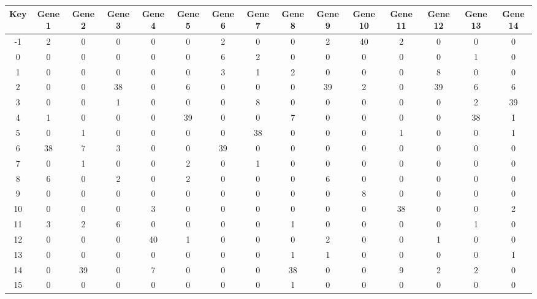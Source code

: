 \begin{tabular}{|c|c|c|c|c|c|c|c|c|c|c|c|c|c|c|}
\hline
Key & Gene 1 & Gene 2 & Gene 3 & Gene 4 & Gene 5 & Gene 6 & Gene 7 & Gene 8 & Gene 9 & Gene 10 & Gene 11 & Gene 12 & Gene 13 & Gene 14 \\
\hline
-1 & 2 & 0 & 0 & 0 & 0 & 2 & 0 & 0 & 2 & 40 & 2 & 0 & 0 & 0 \\
0 & 0 & 0 & 0 & 0 & 0 & 6 & 2 & 0 & 0 & 0 & 0 & 0 & 1 & 0 \\
1 & 0 & 0 & 0 & 0 & 0 & 3 & 1 & 2 & 0 & 0 & 0 & 8 & 0 & 0 \\
2 & 0 & 0 & 38 & 0 & 6 & 0 & 0 & 0 & 39 & 2 & 0 & 39 & 6 & 6 \\
3 & 0 & 0 & 1 & 0 & 0 & 0 & 8 & 0 & 0 & 0 & 0 & 0 & 2 & 39 \\
4 & 1 & 0 & 0 & 0 & 39 & 0 & 0 & 7 & 0 & 0 & 0 & 0 & 38 & 1 \\
5 & 0 & 1 & 0 & 0 & 0 & 0 & 38 & 0 & 0 & 0 & 1 & 0 & 0 & 1 \\
6 & 38 & 7 & 3 & 0 & 0 & 39 & 0 & 0 & 0 & 0 & 0 & 0 & 0 & 0 \\
7 & 0 & 1 & 0 & 0 & 2 & 0 & 1 & 0 & 0 & 0 & 0 & 0 & 0 & 0 \\
8 & 6 & 0 & 2 & 0 & 2 & 0 & 0 & 0 & 6 & 0 & 0 & 0 & 0 & 0 \\
9 & 0 & 0 & 0 & 0 & 0 & 0 & 0 & 0 & 0 & 8 & 0 & 0 & 0 & 0 \\
10 & 0 & 0 & 0 & 3 & 0 & 0 & 0 & 0 & 0 & 0 & 38 & 0 & 0 & 2 \\
11 & 3 & 2 & 6 & 0 & 0 & 0 & 0 & 1 & 0 & 0 & 0 & 0 & 1 & 0 \\
12 & 0 & 0 & 0 & 40 & 1 & 0 & 0 & 0 & 2 & 0 & 0 & 1 & 0 & 0 \\
13 & 0 & 0 & 0 & 0 & 0 & 0 & 0 & 1 & 1 & 0 & 0 & 0 & 0 & 1 \\
14 & 0 & 39 & 0 & 7 & 0 & 0 & 0 & 38 & 0 & 0 & 9 & 2 & 2 & 0 \\
15 & 0 & 0 & 0 & 0 & 0 & 0 & 0 & 1 & 0 & 0 & 0 & 0 & 0 & 0 \\
\hline
\end{tabular}